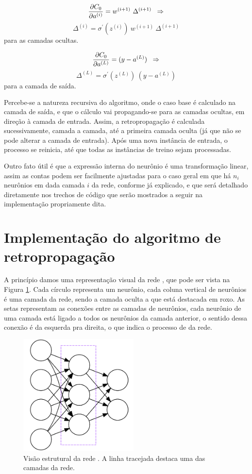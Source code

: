\[ \dfrac{\partial C_0}{\partial a^{(i)}} = w^{(i+1)}~ \Delta^{(i+1)}  \;\;\Rightarrow \]
\begin{equation}\label{retro:15}
\Delta^{(i)} = \sigma^{'}(z^{(i)})~ w^{(i+1)}~ \Delta^{(i+1)}
\end{equation}
para as camadas ocultas.


\[ \dfrac{\partial C_0}{\partial a^{(L)}} = (y - a^{(L)}) \;\;\Rightarrow \]
\begin{equation}\label{retro:16}
\Delta^{(L)} = \sigma^{'}(z^{(L)})~ (y - a^{(L)})
\end{equation}
para a camada de saída.

Percebe-se a natureza recursiva do algoritmo, onde o caso base é calculado na camada de saída, e que o cálculo vai propagando-se para as camadas ocultas, em direção à camada de entrada. Assim, a retropropagação é calculada sucessivamente, camada a camada, até a primeira camada oculta (já que não se pode alterar a camada de entrada). Após uma nova instância de entrada, o processo se reinicia, até que todas as instâncias de treino sejam processadas.

Outro fato útil é que a expressão interna do neurônio é uma transformação linear, assim as contas podem ser facilmente ajustadas para o caso geral em que há $n_i$ neurônios em dada camada $i$ da rede, conforme já explicado, e que será detalhado diretamente nos trechos de código que serão mostrados a seguir na implementação propriamente dita.

\section{Implementação do algoritmo de retropropagação}

A princípio damos uma representação visual da rede , que pode ser vista na Figura \ref{fig:estrutura_rn}. Cada círculo representa um neurônio, cada coluna vertical de neurônios é uma camada da rede, sendo a camada oculta a que está destacada em roxo. As setas representam as conexões entre as camadas de neurônios, cada neurônio de uma camada está ligado a todos os neurônios da camada anterior, o sentido dessa conexão é da esquerda pra direita, o que indica o processo de  da rede.

\begin{figure}[htb]
\centering
\includegraphics[width=6cm]{figuras/estrutura_rn}
\caption{Visão estrutural da rede . A linha tracejada destaca uma das camadas da rede.}
\label{fig:estrutura_rn}
\end{figure}


